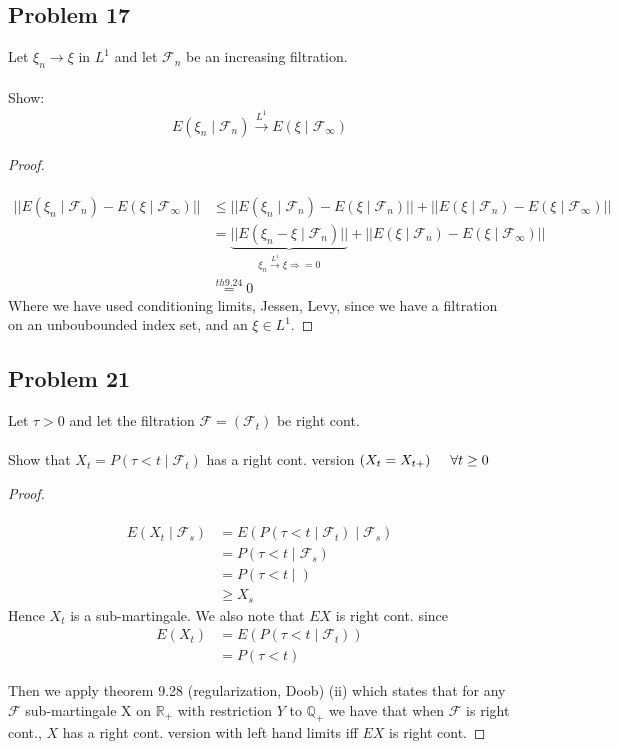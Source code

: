 \documentclass[11pt]{article}
\begin{document}
\subsection*{Problem 17}
Let $\xi_n \rightarrow \xi$ in $L^1$ and let $\mathcal{F}_n$ be an increasing filtration.\\ 
\\
Show: 
\begin{align*}
	E(\xi_n \mid \mathcal{F}_n) \overset{L^1}{\rightarrow} E(\xi \mid \mathcal{F}_\infty)
\end{align*}
\begin{proof}
	\\ \\
	\begin{align*}
		|| E(\xi_n \mid \mathcal{F}_n) - E(\xi \mid \mathcal{F}_\infty) || &\leq || E(\xi_n \mid \mathcal{F}_n) - E(\xi \mid \mathcal{F}_n)|| + || E(\xi \mid \mathcal{F}_n)- E(\xi \mid \mathcal{F}_\infty) || \\ 
		&= \underbrace{|| E(\xi_n - \xi \mid \mathcal{F}_n) ||}_{\xi_n \overset{L^1}{\rightarrow} \xi \Rightarrow =0 } + || E(\xi \mid \mathcal{F}_n ) - E(\xi \mid \mathcal{F}_\infty)||\\
		&\overset{th 9.24}{=}  0
	\end{align*}
Where we have used conditioning limits, Jessen, Levy, since we have a filtration on an unboubounded index set, and an $\xi\in L^1$.
\end{proof}

\subsection*{Problem 21}
Let $\tau > 0$ and let the filtration $\mathcal{F}=(\mathcal{F}_t)$ be right cont. \\ \\
Show that $X_t = P(\tau < t \mid \mathcal{F}_t)$ has a right cont. version $(X_t = X_{t+}) \hspace{0.5cm} \forall t \geq 0$
\begin{proof}\\ \\
	\begin{align*}
		E(X_t \mid \mathcal{F}_s) &= E(P(\tau < t \mid \mathcal{F}_t ) \mid \mathcal{F}_s) \\
		&=P(\tau < t \mid \mathcal{F}_s) \\
		&=P(\tau < t \mid ) \\
		&\geq X_s
	\end{align*}
	Hence $X_t$ is a sub-martingale. We also note that $EX$ is right cont. since 
	\begin{align*}
		E(X_t) &= E(P(\tau < t \mid \mathcal{F}_t)) \\
		&= P(\tau < t) 
	\end{align*}

	Then we apply theorem 9.28 (regularization, Doob) (ii) which states that for any $\mathcal{F}$ sub-martingale X on $\mathbb{R}_+$ with restriction $Y$ to $\mathbb{Q}_+$ we have 
	that when $\mathcal{F}$ is right cont., $X$ has a right cont. version with left hand limits iff $EX$ is right cont. 
\end{proof}
\end{document}
